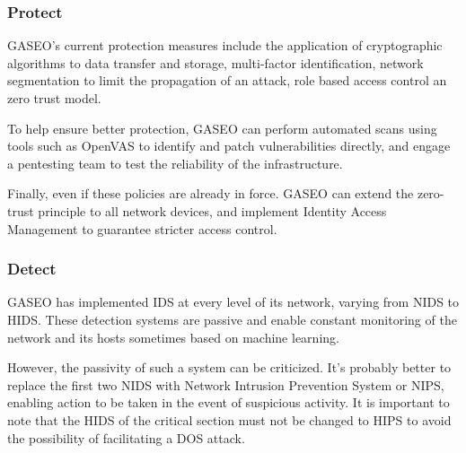 \documentclass[12pt]{article}
\begin{document}
\subsubsection*{Protect}
GASEO's current protection measures include the application of cryptographic algorithms to data transfer and storage, multi-factor identification, network segmentation to limit the propagation of an attack, role based access control an zero trust model.

To help ensure better protection, GASEO can perform automated scans using tools such as OpenVAS to identify and patch vulnerabilities directly, and engage a pentesting team to test the reliability of the infrastructure. 

Finally, even if these policies are already in force. GASEO can extend the zero-trust principle to all network devices, and implement Identity Access Management to guarantee stricter access control.

\subsubsection*{Detect}
GASEO has implemented IDS at every level of its network, varying from NIDS to HIDS. These detection systems are passive and enable constant monitoring of the network and its hosts sometimes based on machine learning.

However, the passivity of such a system can be criticized. It's probably better to replace the first two NIDS with Network Intrusion Prevention System or NIPS, enabling action to be taken in the event of suspicious activity.
It is important to note that the HIDS of the critical section must not be changed to HIPS to avoid the possibility of facilitating a DOS attack.
\end{document}
